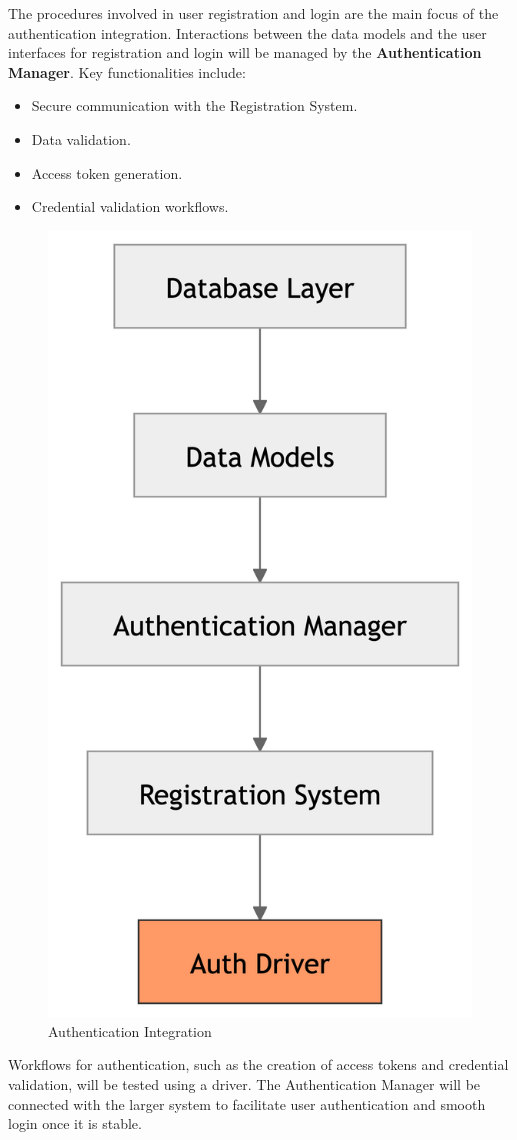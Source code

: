 The procedures involved in user registration and login are the main focus of the authentication integration. Interactions between the data models and the user interfaces for registration and login will be managed by the \textbf{Authentication Manager}. Key functionalities include:
\begin{itemize}
    \item Secure communication with the Registration System.
    \item Data validation.
    \item Access token generation.
    \item Credential validation workflows.
\end{itemize}
\begin{figure}[H]
    \begin{center} \includegraphics[width=0.18\linewidth]{JhaBhatiaSharma/imagesDD/AuthenticationIntegration.png}
    \caption{Authentication Integration}
        \label{fig:authenticationIntegration}
    \end{center}
\end{figure}

Workflows for authentication, such as the creation of access tokens and credential validation, will be tested using a driver. The Authentication Manager will be connected with the larger system to facilitate user authentication and smooth login once it is stable.


